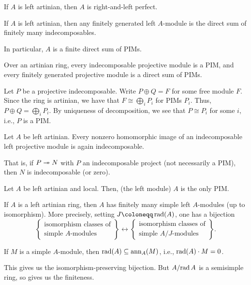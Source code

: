 \documentclass[12pt]{article}
\begin{document}
\begin{thm}
	If $A$ is left artinian, then $A$ is right-and-left perfect.
\end{thm}

\begin{thm}
	If $A$ is left artinian, then any finitely generated left $A$-module is the direct sum of finitely many indecomposables. 

	In particular, $A$ is a finite direct sum of PIMs.
\end{thm}
\begin{thm}
	Over an artinian ring, every indecomposable projective module is a PIM, 
	and every finitely generated projective module is a direct sum of PIMs.
\end{thm}
\begin{sketch}
	Let $P$ be a projective indecomposable. 
	Write $P \oplus Q = F$ for some free module $F$.
	Since the ring is artinian, we have that $F \cong \bigoplus_{i} P_{i}$ for PIMs $P_{i}$. 
	Thus, $P \oplus Q = \bigoplus_{i} P_{i}$. 
	By uniqueness of decomposition, we see that $P \cong P_{i}$ for some $i$, i.e., 
	$P$ is a PIM.
\end{sketch}

\begin{thm}
	Let $A$ be left artinian. 
	Every nonzero homomorphic image of an indecomposable left projective module is again indecomposable.

	That is, if $P \twoheadrightarrow N$ with $P$ an indecomposable project (not necessarily a PIM), then $N$ is indecomposable (or zero).
\end{thm}

\begin{thm}
	Let $A$ be left artinian and local.
	Then, (the left module) $A$ is the only PIM.
\end{thm}

\begin{thm}
	If $A$ is a left artinian ring, then $A$ has finitely many simple left $A$-modules (up to isomorphism). 
	More precisely, setting $J \coloneqq \rad(A)$, one has a bijection
	\begin{equation*} 
		\left\{
			\begin{array}{c}
				\text{isomorphism classes of}\\
				\text{simple $A$-modules}
			\end{array}
		\right\}
		\leftrightarrow 
		\left\{
			\begin{array}{c}
				\text{isomorphism classes of}\\
				\text{simple $A/J$-modules}
			\end{array}
		\right\}.
	\end{equation*}
\end{thm}
\begin{sketch}
	If $M$ is a simple $A$-module, then $\operatorname{rad}(A) \subseteq \operatorname{ann}_{A}(M)$, i.e., $\operatorname{rad}(A) \cdot M = 0$. 

	This gives us the isomorphism-preserving bijection. 
	But $A/{\operatorname{rad} A}$ is a semisimple ring, so 
	 gives us the finiteness.
\end{sketch}
\end{document}
